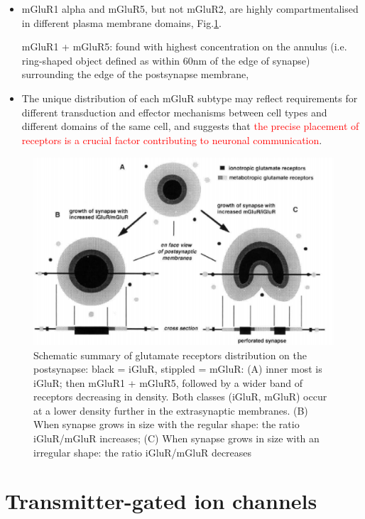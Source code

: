 \begin{itemize}
  \item mGluR1 alpha and mGluR5, but not mGluR2, are highly compartmentalised in
  different plasma membrane domains, Fig.\ref{fig:GluR-distribution-synapse}.
  
  mGluR1 + mGluR5: found with highest concentration on the annulus (i.e.
  ring-shaped object defined as within 60nm of the edge of synapse) surrounding
  the edge of the postsynapse membrane,
  
  \item The unique distribution of each mGluR subtype may reflect requirements
  for different transduction and effector mechanisms between cell types and
  different domains of the same cell, and suggests that \textcolor{red}{the
  precise placement of receptors is a crucial factor contributing to neuronal
  communication}.
  
\end{itemize}

 \begin{figure}[hbtp]
  \centerline{\includegraphics[height=7cm,
    angle=0]{./images/GluR-distribution-synapse.eps}}
  \caption{Schematic summary of glutamate receptors distribution on the
  postsynapse: black = iGluR, stippled = mGluR: (A) inner most is iGluR; then
  mGluR1 + mGluR5, followed by a wider band of receptors decreasing in density.
  Both classes (iGluR, mGluR) occur at a lower density further in the
  extrasynaptic membranes. (B) When synapse grows in size with the regular
  shape: the ratio iGluR/mGluR increases; (C) When synapse grows in size with an
  irregular shape: the ratio iGluR/mGluR decreases }
  \label{fig:GluR-distribution-synapse}
\end{figure}

\section{Transmitter-gated ion channels}
\label{sec:transmitter-gated-ion-channel}

